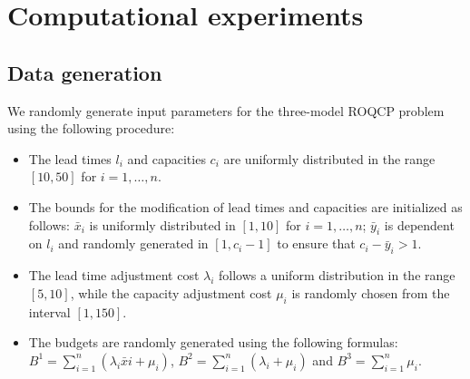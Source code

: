 \documentclass{article}
\theoremstyle{plain}
\begin{document}
\section*{Computational experiments} 

\subsection*{Data generation}
We randomly generate input parameters for the three-model ROQCP problem using the following procedure:

\begin{itemize}
    \item The lead times $l_i$ and capacities $c_i$ are uniformly distributed in the range $[10, 50]$ for $i = 1, \ldots, n$.
    \item The bounds for the modification of lead times and capacities are initialized as follows: $\bar{x}_i$ is uniformly distributed in $[1, 10]$ for $i = 1, \ldots, n$; $\bar{y}_i$ is dependent on $l_i$ and randomly generated in $[1, c_i - 1]$ to ensure that $c_i - \bar{y}_i > 1$.
    \item The lead time adjustment cost $\lambda_i$ follows a uniform distribution in the range $[5, 10]$, while the capacity adjustment cost $\mu_i$ is randomly chosen from the interval $[1, 150]$.
    \item The budgets are randomly generated using the following formulas: ${B^1} = \sum\limits_{i=1}^n {(\lambda_i \bar{x}i + \mu_i)}$, ${B^2} = \sum\limits_{i = 1}^n {({\lambda _i} + {\mu _i})} $ and ${B^3} = \sum\limits_{i=1}^n {\mu_i}$.
\end{itemize}
\end{document}
